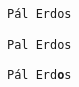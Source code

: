 {\tt P\'al Erd}\H{\tt o}{\tt s}

{\tt P}\'{\tt a}{\tt l Erd}\H{\tt o}{\tt s}

{\tt P\'al Erd{\bf\H{\tt o}}s}

